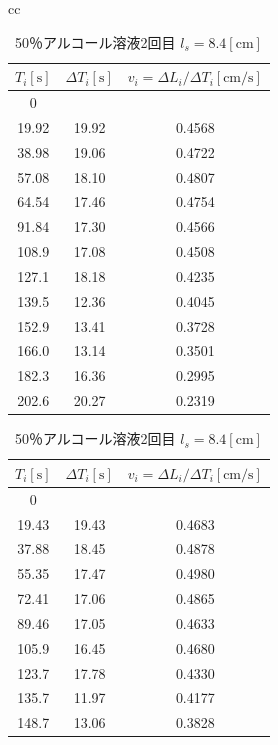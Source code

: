 \documentclass[a4j,10pt]{jarticle}
\begin{document}
\begin{itemize}
\begin{table}[h]
\begin{tabular}{cc}
\begin{minipage}{.5\hsize}
\begin{center}
\caption{50％アルコール溶液1回目 $l_s=8.7[\mathrm{cm}]$}
\label{50-1}
\begin{tabular}{|c|c|c|} \hline
  $T_i[\mathrm s]$ & $\Delta T_i[\mathrm s]$ & $v_i=\Delta L_i/\Delta T_i\mathrm{[cm/s]}$ \\ \hline \hline
  0&&\\\hline
19.92&19.92&0.4568\\\hline
38.98&19.06&0.4722\\\hline
57.08&18.10&0.4807\\\hline
64.54&17.46&0.4754\\\hline
91.84&17.30&0.4566\\\hline
108.9&17.08&0.4508\\\hline
127.1&18.18&0.4235\\\hline
139.5&12.36&0.4045\\\hline
152.9&13.41&0.3728\\\hline
166.0&13.14&0.3501\\\hline
182.3&16.36&0.2995\\\hline
202.6&20.27&0.2319\\\hline
\end{tabular}
\end{center}
\end{minipage}
\begin{minipage}{.5\hsize}
\begin{center}
\caption{50％アルコール溶液2回目 $l_s=8.4[\mathrm{cm}]$}
\label{50-2}
\begin{tabular}{|c|c|c|} \hline
  $T_i[\mathrm s]$ & $\Delta T_i[\mathrm s]$ & $v_i=\Delta L_i/\Delta T_i\mathrm{[cm/s]}$ \\ \hline \hline
  0&&\\\hline
19.43&19.43&0.4683\\\hline
37.88&18.45&0.4878\\\hline
55.35&17.47&0.4980\\\hline
72.41&17.06&0.4865\\\hline
89.46&17.05&0.4633\\\hline
105.9&16.45&0.4680\\\hline
123.7&17.78&0.4330\\\hline
135.7&11.97&0.4177\\\hline
148.7&13.06&0.3828\\\hline

\end{tabular}
\end{center}
\end{minipage}
\end{tabular}
\end{table}
\end{itemize}
\end{document}
